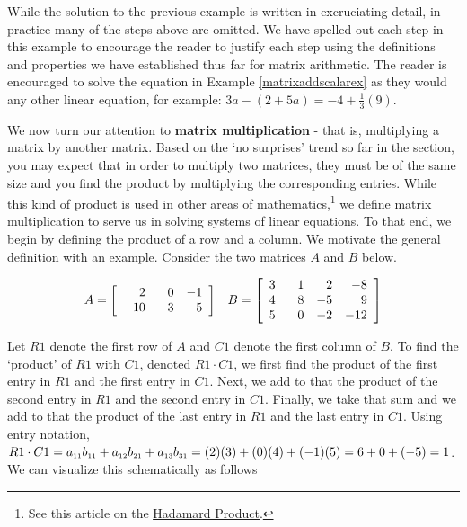 While the solution to the previous example is written in excruciating detail, in practice many of the steps above are omitted.  We have spelled out each step in this example to encourage the reader to justify each step using the definitions and properties we have established thus far for matrix arithmetic.  The reader is encouraged to solve the equation in Example \ref{matrixaddscalarex} as they would any other linear equation, for example: $3a-(2+5a)=-4+\frac{1}{3}(9)$.

\smallskip

We now turn our attention to \textbf{matrix multiplication} - that is, multiplying a matrix by another matrix.  Based on the `no surprises' trend so far in the section, you may expect that in order to multiply two matrices, they must be of the same size and you find the product by multiplying the corresponding entries.  While this kind of product is used in other areas of mathematics,\footnote{See this article on the \href{http://en.wikipedia.org/wiki/Matrix_multiplication}{\underline{Hadamard Product}}.} we define matrix multiplication to serve us in solving systems of linear equations.  To that end, we begin by defining the product of a row and a column.  We motivate the general definition with an example.  Consider the two matrices $A$ and $B$ below.

\[ \begin{array}{cc}

A = \left[\begin{array}{rrr} 2 & \hphantom{-}0 & -1 \\ -10 & 3 & 5 \\ \end{array} \right]

&

B = \left[\begin{array}{rrrr} 3 & \hphantom{-}1 & 2 & -8 \\ 4 & 8 & -5 & 9  \\ 5 & 0 & -2 & -12 \\  \end{array} \right]

\end{array}\]

Let $R1$ denote the first row of $A$ and $C1$ denote the first column of $B$.  To find the `product' of $R1$ with $C1$, denoted $R1 \cdot C1$, we first find the product of the first entry in $R1$ and the first entry in $C1$.  Next, we add to that the product of the second entry in $R1$ and the second entry in $C1$.  Finally, we take that sum and we add to that the product of the last entry in $R1$ and the last entry in $C1$.  Using entry notation, $R1 \cdot C1 = a_{\mbox{\tiny$11$}}b_{\mbox{\tiny$11$}} + a_{\mbox{\tiny$12$}}b_{\mbox{\tiny$21$}}+a_{\mbox{\tiny$13$}}b_{\mbox{\tiny$31$}} = (2)(3) + (0)(4) + (-1)(5) = 6 + 0 + (-5) = 1$.  We can visualize this schematically as follows

